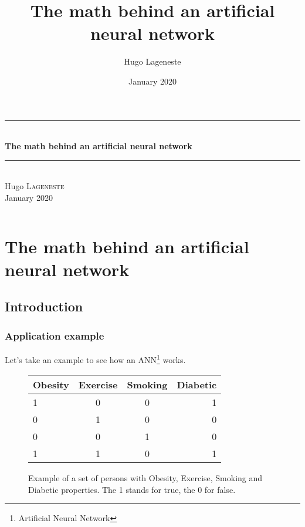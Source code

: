 \documentclass[]{report}
\title{The math behind an artificial neural network}
\author{Hugo Lageneste}
\date{January 2020}
\begin{document}
\begin{titlepage}
    \center
    
    \newcommand{\HRule}{\rule{\linewidth}{0.5mm}}
    \HRule \\[0.4cm]
    {\huge \bfseries The math behind an artificial neural network  }\\[0.1cm]
    \HRule \\[0.4cm]
    
    {Hugo \textsc{Lageneste}}\\[0.5cm]
    {\large January 2020}\\[2cm]
    
    \vfill
    \begin{neuralnetwork}[height=10, nodespacing=25mm, layerspacing=35mm, nodesize=30pt]
        \hiddenlayer[count=6, bias=false]
        \linklayers
        \hiddenlayer[count=6, bias=false]
        \linklayers
        \outputlayer[count=3]
        \linklayers
    \end{neuralnetwork}
    \vfill
\end{titlepage}

\begingroup
\let\cleardoublepage\relax
\let\clearpage\relax

\tableofcontents

\needspace{6cm}
\[\;\]

\vfill

\endgroup

\chapter*{The math behind an artificial neural network}

\setcounter{section}{-1}
\section{Introduction}
\label{sec:intro}

\subsection{Application example}

{Let's take an example to see how an ANN\footnote{Artificial Neural Network} works.}

\begin{figure}[H]
    \centering
    \begin{tabular}{|l|c|c|r|}
      \hline
      Obesity & Exercise & Smoking & Diabetic \\
      \hline
      1 & 0 & 0 & 1 \\
      0 & 1 & 0 & 0 \\
      0 & 0 & 1 & 0 \\
      1 & 1 & 0 & 1 \\
      \hline
    \end{tabular}
    \caption{Example of a set of persons with Obesity, Exercise, Smoking and Diabetic properties. The 1 stands for true, the 0 for false.}
\end{figure}
\end{document}
